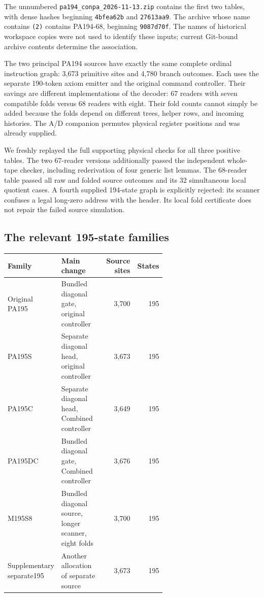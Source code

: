 \documentclass[11pt,letterpaper]{article}
\newcommand{\file}[1]{\texttt{\nolinkurl{#1}}}
\begin{document}
The unnumbered \file{pa194_conpa_2026-11-13.zip} contains the first two
tables, with dense hashes beginning \file{4bfea62b} and \file{27613aa9}.
The archive whose name contains \file{(2)} contains PA194-68, beginning
\file{9087d70f}. The names of historical workspace copies were not used
to identify these inputs; current Git-bound archive contents determine
the association.

The two principal PA194 sources have exactly the same complete ordinal
instruction graph: 3,673 primitive sites and 4,780 branch outcomes. Each
uses the separate 190-token axiom emitter and the original command
controller. Their savings are different implementations of the decoder:
67 readers with seven compatible folds versus 68 readers with eight.
Their fold counts cannot simply be added because the folds depend on
different trees, helper rows, and incoming histories. The A/D companion
permutes physical register positions and was already supplied.

We freshly replayed the full supporting physical checks for all three
positive tables. The two 67-reader versions additionally passed the
independent whole-tape checker, including rederivation of four generic
list lemmas. The 68-reader table passed all raw and folded source outcomes
and its 32 simultaneous local quotient cases. A fourth supplied
194-state graph is explicitly rejected: its scanner confuses a legal
long-zero address with the header. Its local fold certificate does not
repair the failed source simulation.

\subsection{The relevant 195-state families}

\begin{center}\small
\begin{tabular}{@{}p{0.23\linewidth}p{0.39\linewidth}rr@{}}
\toprule
Family & Main change & Source sites & States\\
\midrule
Original PA195 & Bundled diagonal gate, original controller &3,700&195\\
PA195S & Separate diagonal head, original controller &3,673&195\\
PA195C & Separate diagonal head, Combined controller &3,649&195\\
PA195DC & Bundled diagonal gate, Combined controller &3,676&195\\
M195S8 & Bundled diagonal source, longer scanner, eight folds &3,700&195\\
Supplementary separate195 & Another allocation of separate source &3,673&195\\
\bottomrule
\end{tabular}
\end{center}
\end{document}
